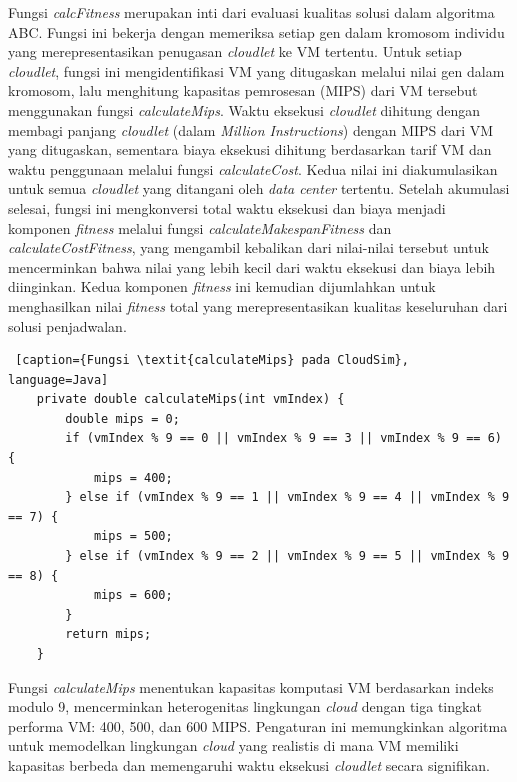 Fungsi \textit{calcFitness} merupakan inti dari evaluasi kualitas solusi dalam algoritma ABC. Fungsi ini bekerja dengan memeriksa setiap gen dalam kromosom individu yang merepresentasikan penugasan \textit{cloudlet} ke VM tertentu. Untuk setiap \textit{cloudlet}, fungsi ini mengidentifikasi VM yang ditugaskan melalui nilai gen dalam kromosom, lalu menghitung kapasitas pemrosesan (MIPS) dari VM tersebut menggunakan fungsi \textit{calculateMips}. Waktu eksekusi \textit{cloudlet} dihitung dengan membagi panjang \textit{cloudlet} (dalam \textit{Million Instructions}) dengan MIPS dari VM yang ditugaskan, sementara biaya eksekusi dihitung berdasarkan tarif VM dan waktu penggunaan melalui fungsi \textit{calculateCost}. Kedua nilai ini diakumulasikan untuk semua \textit{cloudlet} yang ditangani oleh \textit{data center} tertentu. Setelah akumulasi selesai, fungsi ini mengkonversi total waktu eksekusi dan biaya menjadi komponen \textit{fitness} melalui fungsi \textit{calculateMakespanFitness} dan \textit{calculateCostFitness}, yang mengambil kebalikan dari nilai-nilai tersebut untuk mencerminkan bahwa nilai yang lebih kecil dari waktu eksekusi dan biaya lebih diinginkan. Kedua komponen \textit{fitness} ini kemudian dijumlahkan untuk menghasilkan nilai \textit{fitness} total yang merepresentasikan kualitas keseluruhan dari solusi penjadwalan.

\begin{lstlisting} [caption={Fungsi \textit{calculateMips} pada CloudSim}, language=Java]
    private double calculateMips(int vmIndex) {
        double mips = 0;
        if (vmIndex % 9 == 0 || vmIndex % 9 == 3 || vmIndex % 9 == 6) {
            mips = 400;
        } else if (vmIndex % 9 == 1 || vmIndex % 9 == 4 || vmIndex % 9 == 7) {
            mips = 500;
        } else if (vmIndex % 9 == 2 || vmIndex % 9 == 5 || vmIndex % 9 == 8) {
            mips = 600;
        }
        return mips;
    }
\end{lstlisting}

Fungsi \textit{calculateMips} menentukan kapasitas komputasi VM berdasarkan indeks modulo 9, mencerminkan heterogenitas lingkungan \textit{cloud} dengan tiga tingkat performa VM: 400, 500, dan 600 MIPS. Pengaturan ini memungkinkan algoritma untuk memodelkan lingkungan \textit{cloud} yang realistis di mana VM memiliki kapasitas berbeda dan memengaruhi waktu eksekusi \textit{cloudlet} secara signifikan.

